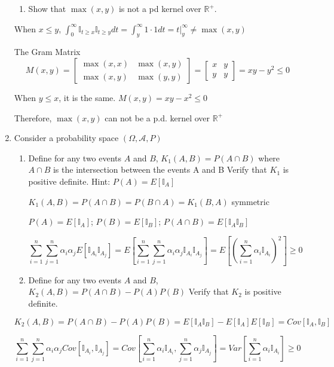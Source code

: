 \documentclass[11pt]{article}
\begin{document}
\begin{enumerate}
\begin{enumerate}
\item Show that $\max(x,y)$ is not a pd kernel over  $\mathbb{R}^+$. 
\end{enumerate}

\vspace{2mm}

When $x\le y$, $\int_0^\infty \mathbb{I}_{t\geq x} \mathbb{I}_{t\geq y} dt=\int_y^\infty 1\cdot 1 dt=\left.t\right|_y^\infty\neq\max(x,y)$

The Gram Matrix
$$M(x,y)=\begin{bmatrix}\max(x, x) & \max(x, y)\\\max(x,y) & \max(y,y)\end{bmatrix} =
       \begin{bmatrix}x &y \\y & y\end{bmatrix}=xy-y^2\le 0$$

When $y\le x$, it is the same. $M(x,y)=xy-x^2\le 0$

Therefore, $\max(x,y)$ can not be a p.d. kernel over  $\mathbb{R}^+$


\item Consider a probability space $(\Omega,\mathcal{A},P)$



\begin{enumerate}
\item Define for any two events $A$ and $B$, $K_1(A,B)=P(A \cap B)$
where $A \cap B$ is the intersection between the events A and B 
Verify that $K_1$ is positive definite. Hint: $P(A)=E[\mathbb{I}_A]$

\vspace{2mm}
$K_1(A,B)=P(A \cap B)=P(B \cap A)=K_1(B,A)$ symmetric

$P(A)=E[\mathbb{I}_A]$; $P(B)=E[\mathbb{I}_B]$; $P(A\cap B)=E[\mathbb{I}_A\mathbb{I}_B]$

$$\sum_{i=1}^n\sum_{j=1}^n\alpha_i\alpha_jE[\mathbb{I}_{A_i}\mathbb{I}_{A_j}]=E[\sum_{i=1}^n\sum_{j=1}^n\alpha_i\alpha_j\mathbb{I}_{A_i}\mathbb{I}_{A_j}]=E[(\sum_{i=1}^n\alpha_i\mathbb{I}_{A_i})^2]\ge0$$


\item Define for any two events $A$ and $B$, 
$K_2(A,B)=P(A \cap B)-P(A)P(B)$
Verify that $K_2$ is positive definite. 
\end{enumerate}

\vspace{2mm}
$K_2(A,B)=P(A \cap B)-P(A)P(B)=E[\mathbb{I}_A\mathbb{I}_B]-E[\mathbb{I}_A]E[\mathbb{I}_B]=Cov[\mathbb{I}_A,\mathbb{I}_B]$

$$\sum_{i=1}^n\sum_{j=1}^n\alpha_i\alpha_jCov[\mathbb{I}_{A_i},\mathbb{I}_{A_j}]=Cov[\sum_{i=1}^n\alpha_i\mathbb{I}_{A_i},\sum_{j=1}^n\alpha_j\mathbb{I}_{A_j}]=Var[\sum_{i=1}^n\alpha_i\mathbb{I}_{A_i}]\ge 0$$



\end{enumerate}
\end{document}
